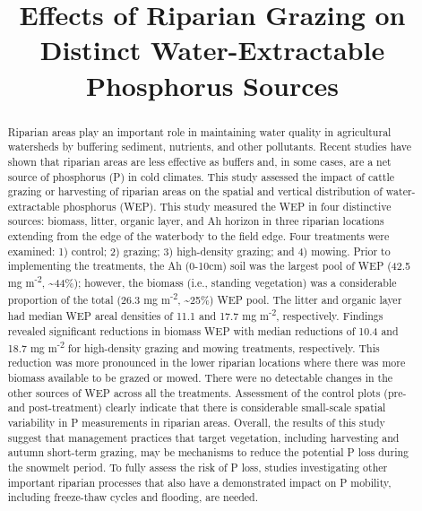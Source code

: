 \documentclass[
]{agujournal2019}
\begin{document}
\title{Effects of Riparian Grazing on Distinct Water-Extractable
Phosphorus Sources}



\begin{abstract}
Riparian areas play an important role in maintaining water quality in
agricultural watersheds by buffering sediment, nutrients, and other
pollutants. Recent studies have shown that riparian areas are less
effective as buffers and, in some cases, are a net source of phosphorus
(P) in cold climates. This study assessed the impact of cattle grazing
or harvesting of riparian areas on the spatial and vertical distribution
of water-extractable phosphorus (WEP). This study measured the WEP in
four distinctive sources: biomass, litter, organic layer, and Ah horizon
in three riparian locations extending from the edge of the waterbody to
the field edge. Four treatments were examined: 1) control; 2) grazing;
3) high-density grazing; and 4) mowing. Prior to implementing the
treatments, the Ah (0-10cm) soil was the largest pool of WEP (42.5 mg
m\textsuperscript{-2}, \textasciitilde44\%); however, the biomass (i.e.,
standing vegetation) was a considerable proportion of the total (26.3 mg
m\textsuperscript{-2}, \textasciitilde25\%) WEP pool. The litter and
organic layer had median WEP areal densities of 11.1 and 17.7 mg
m\textsuperscript{-2}, respectively. Findings revealed significant
reductions in biomass WEP with median reductions of 10.4 and 18.7 mg
m\textsuperscript{-2} for high-density grazing and mowing treatments,
respectively. This reduction was more pronounced in the lower riparian
locations where there was more biomass available to be grazed or mowed.
There were no detectable changes in the other sources of WEP across all
the treatments. Assessment of the control plots (pre- and
post-treatment) clearly indicate that there is considerable small-scale
spatial variability in P measurements in riparian areas. Overall, the
results of this study suggest that management practices that target
vegetation, including harvesting and autumn short-term grazing, may be
mechanisms to reduce the potential P loss during the snowmelt period. To
fully assess the risk of P loss, studies investigating other important
riparian processes that also have a demonstrated impact on P mobility,
including freeze-thaw cycles and flooding, are needed.
\end{abstract}
\end{document}

